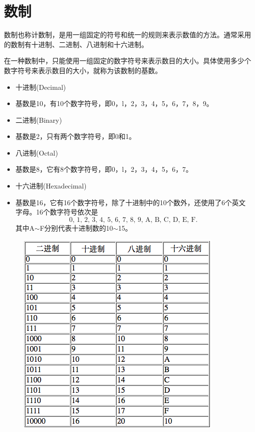 \section{数制}

\begin{frame}\ft{\secname}
\begin{defn}{}
数制也称计数制，是用一组固定的符号和统一的规则来表示数值的方法。通常采用的数制有十进制、二进制、八进制和十六进制。
\end{defn}
\vspace{0.2in}

在一种数制中，只能使用一组固定的数字符号来表示数目的大小。具体使用多少个数字符号来表示数目的大小，就称为该数制的基数。
\end{frame}

\begin{frame}\ft{\secname}
\begin{itemize}
\item 十进制(Decimal)
\item[]
  基数是10，有10个数字符号，即0，l，2，3，4，5，6，7，8，9。\\[0.1in]
\item 二进制(Binary)
\item[]
  基数是2，只有两个数字符号，即0和1。\\[0.1in]
\item 八进制(Octal)
\item[]
  基数是8，它有8个数字符号，即0，l，2，3，4，5，6，7。\\[0.1in]
\item 十六进制(Hexadecimal)
\item[]
  基数是16，它有16个数字符号，除了十进制中的10个数外，还使用了6个英文字母。16个数字符号依次是
  $$\mbox{0,~1,~2,~3,~4,~5,~6,~7,~8,~9,~A,~B,~C,~D,~E,~F.}$$
  其中A$\sim$F分别代表十进制数的10$\sim$15。
\end{itemize}
\end{frame}




\begin{frame}\ft{\secname}
\begin{figure}[h]
\centering
\includegraphics[width=3.in]{slide01/images/shuzhi}
\end{figure}
\end{frame}


